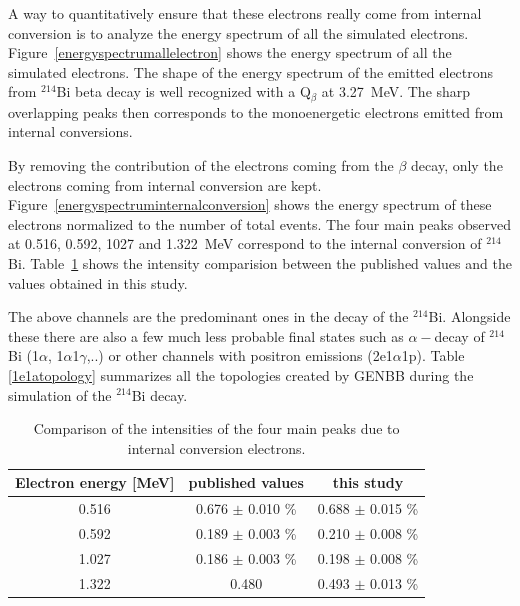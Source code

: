 \documentclass[main.tex]{subfiles}
\begin{document}
\bigskip

 
\noindent A way to quantitatively ensure that these electrons really come from internal conversion is to analyze the energy spectrum of all the simulated electrons. Figure~\ref{energyspectrumallelectron} shows the energy spectrum of all the simulated electrons. The shape of the energy spectrum of the emitted electrons from $^{\text{214}}$Bi beta decay is well recognized with a Q$_\beta$ at 3.27~MeV. The sharp overlapping peaks then corresponds to the monoenergetic electrons emitted from internal conversions. 


\bigskip

\noindent By removing the contribution of the electrons coming from the $\beta$ decay, only the electrons coming from internal conversion are kept. Figure~\ref{energyspectruminternalconversion} shows the energy spectrum of these electrons normalized to the number of total events. The four main peaks observed at 0.516, 0.592, 1027 and 1.322~MeV correspond to the internal conversion of $^{\text{214}}$Bi. Table~\ref{internalconversioncomparaison} shows the intensity comparision between the published values \cite{NuclearDataSheet210} and the values obtained in this study. 


\bigskip


\noindent The above channels are the predominant ones in the decay of the $^{\text{214}}$Bi. Alongside these there are also a few much less probable final states such as $\alpha-$decay of $^{\text{214}}$Bi (1$\alpha$, 1$\alpha$1$\gamma$,..) or other channels with positron emissions (2e1$\alpha$1p). Table \ref{1e1atopology} summarizes all the topologies created by GENBB during the simulation of the $^{\text{214}}$Bi decay.


\begin{table}[h!]
\begin{center}
\begin{tabular}{c|c|c}
Electron energy [MeV]  & published values & this study \\[0.1cm]
\toprule
0.516  & 0.676 $\pm$ 0.010 \% & 0.688 $\pm$ 0.015 \% \\[0.1cm]
0.592  & 0.189 $\pm$ 0.003 \% & 0.210 $\pm$ 0.008 \% \\[0.1cm]
1.027  & 0.186 $\pm$ 0.003 \% & 0.198 $\pm$ 0.008 \% \\[0.1cm]            
1.322  & 0.480  & 0.493 $\pm$ 0.013 \% \\[0.1cm]
\bottomrule
\end{tabular}
\end{center}
\caption{Comparison of the intensities of the four main peaks due to internal conversion electrons.}
\label{internalconversioncomparaison}
\end{table}
\end{document}
